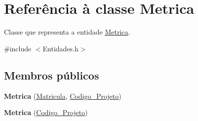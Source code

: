 \hypertarget{class_metrica}{
\section{\-Referência à classe \-Metrica}
\label{class_metrica}
}


\-Classe que representa a entidade \hyperlink{class_metrica}{\-Metrica}.  




{\ttfamily \#include $<$\-Entidades.\-h$>$}

\subsection*{\-Membros públicos}
\begin{DoxyCompactItemize}
\item 
\hypertarget{class_metrica_ac3f82539f38854ddda63a3026d560079}{
{\bfseries \-Metrica} (\hyperlink{class_matricula}{\-Matricula}, \hyperlink{class_codigo___projeto}{\-Codigo\-\_\-\-Projeto})}
\label{class_metrica_ac3f82539f38854ddda63a3026d560079}

\item 
\hypertarget{class_metrica_a813885cfaa96b5e4bc619ccee47b701f}{
{\bfseries \-Metrica} (\hyperlink{class_codigo___projeto}{\-Codigo\-\_\-\-Projeto})}
\label{class_metrica_a813885cfaa96b5e4bc619ccee47b701f}


\end{DoxyCompactItemize}
